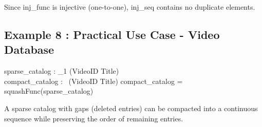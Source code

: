 \documentclass[a4paper,10pt,fleqn]{article}
\begin{document}
\noindent Since inj\_func is injective (one-to-one), inj\_seq contains no duplicate elements.

\bigskip

\subsection*{Example 8 : Practical Use Case - Video Database}

\begin{zed}
\end{zed}

\begin{axdef}
sparse\_catalog : \nat_1 \pfun (VideoID \cross Title) \\
compact\_catalog : \seq~(VideoID \cross Title)
\where
compact\_catalog = squashFunc(sparse\_catalog)
\end{axdef}

\noindent A sparse catalog with gaps (deleted entries) can be compacted into a continuous sequence while preserving the order of remaining entries.

\bigskip
\end{document}
